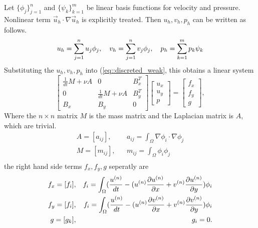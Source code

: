 \documentclass[a4paper, 11pt]{article}
\begin{document}
   Let $\{\phi_j \}_{j = 1}^n$ and $\{\psi_k\}_{k = 1}^m$ be linear basis
   functions for velocity and pressure. Nonlinear term $\vec{u}_h
   \cdot \nabla \vec{u}_h$ is explicitly treated. Then $u_h, v_h, p_h$
   can be written as follows.
   \begin{equation}
     u_h = \sum_{j = 1}^n u_j \phi_j, \quad v_h = \sum_{j = 1}^n v_j
     \phi_j, \quad p_h = \sum_{k = 1}^m p_k \psi_k 
     \notag
   \end{equation}
   Substituting the $u_h, v_h, p_h$ into (\ref{eq::discreted_weak}, 
   this obtains a linear system
   \begin{equation}
     \left[
       \begin{array}{lll}
         \frac{1}{dt} M + \nu A & 0 & B_x^T \\
         0 & \frac{1}{dt} M +\nu A  & B_y^T \\
         B_x & B_y & 0
       \end{array}
     \right]
     \left[
       \begin{array}{c}
          u_x \\
          u_y \\
          p
       \end{array}
     \right] = 
     \left[
       \begin{array}{c}
         f_x \\
         f_y \\
         g
       \end{array}
     \right],
     \label{eq::linear_system}
   \end{equation}
   Where the $n \times n$ matrix $M$ is the mass matrix and the Laplacian
   matrix is $A$, which are trivial.
   \begin{eqnarray}
     A = [a_{ij}], && a_{ij} = \int_\Omega \nabla \phi_i \cdot \nabla
     \phi_j \\
     M = [m_{ij}], && m_{ij} = \int_{\Omega}\phi_i \phi_j \\
   \end{eqnarray}
   the right hand side terms $f_x, f_y, g$ seperatly are
   \begin{eqnarray}
     f_x = [f_i], && f_i = \int_\Omega (\frac{u^{(n)}}{dt} - (u^{(n)}
       \frac{\partial u^{(n)}}{\partial x} + v^{(n)} \frac{\partial
       u^{(n)}}{\partial y}) \phi_i \notag \\
     f_y = [f_i], && f_i = \int_\Omega (\frac{u^{(n)}}{dt} - (u^{(n)}
       \frac{\partial v^{(n)}}{\partial x} + v^{(n)} \frac{\partial
         v^{(n)}}{\partial y}) \phi_i \notag \\
     g = [g_k], && g_i = 0. \notag
   \end{eqnarray}
\end{document}
